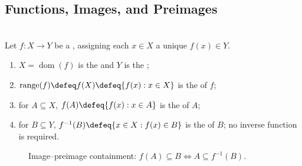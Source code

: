 \subsection{Functions, Images, and Preimages}

\begin{definition} \label{def:functions-images-preimages} \\
Let $f:X\to Y$ be a , assigning each $x\in X$ a unique $f(x)\in Y$.
\begin{enumerate}[label=(\roman*)]
\setlength{\itemsep}{0pt}
\item $X=\operatorname{dom}(f)$ is the  and $Y$ is the ;
\item $\operatorname{range}(f)\defeq f(X)\defeq\{f(x):x\in X\}$ is the  of $f$;
\item for $A\subseteq X$, $f(A)\defeq\{f(x):x\in A\}$ is the  of $A$;
\item for $B\subseteq Y$, $f^{-1}(B)\defeq\{x\in X:f(x)\in B\}$ is the  of $B$; no inverse function is required.
\end{enumerate}
\end{definition}

\begin{figure}[H]
  \centering
  
  \caption{Image--preimage containment: $f(A)\subseteq B \Longleftrightarrow A\subseteq f^{-1}(B)$.}
  \label{fig:function-image-preimage}
\end{figure}

